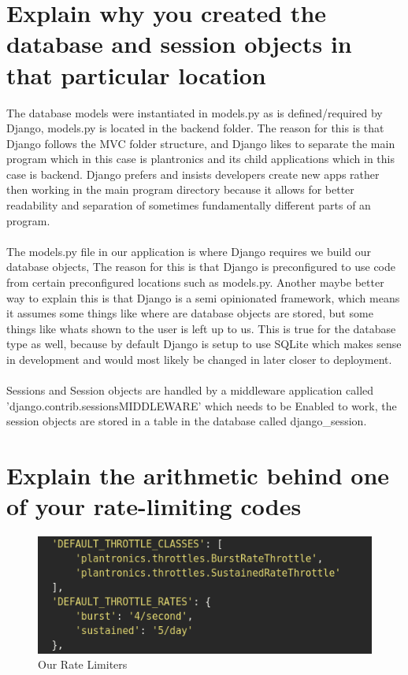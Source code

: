 \documentclass{article}
\begin{document}
    \section{Explain why you created the database and session objects in that particular location}
    The database models were instantiated in models.py as is defined/required by Django, models.py is located in the backend folder. The reason for this is that Django follows the MVC folder structure, and Django likes to separate the main program which in this case is plantronics and its child applications which in this case is backend. Django prefers and insists developers create new apps rather then working in the main program directory because it allows for better readability and separation of sometimes fundamentally different parts of an program.
    \\
    \\
    The models.py file in our application is where Django requires we build our database objects, The reason for this is that Django is preconfigured to use code from certain preconfigured locations such as models.py. Another maybe better way to explain this is that Django is a semi opinionated framework, which means it assumes some things like where are database objects are stored, but some things like whats shown to the user is left up to us. This is true for the database type as well, because by default Django is setup to use SQLite which makes sense in development and would most likely be changed in later closer to deployment.
    \\
    \\
    Sessions and Session objects are handled by a middleware application called 'django.contrib.sessionsMIDDLEWARE' which needs to be Enabled to work, the session objects are stored in a table in the database called django\_session.
    
    \section{Explain the arithmetic behind one of your rate-limiting codes}

    \begin{figure}[!htb]
        \centering
        \caption{Our Rate Limiters}
        \includegraphics[scale=0.70]{ratelimit1}
    \end{figure}
    
\end{document}
